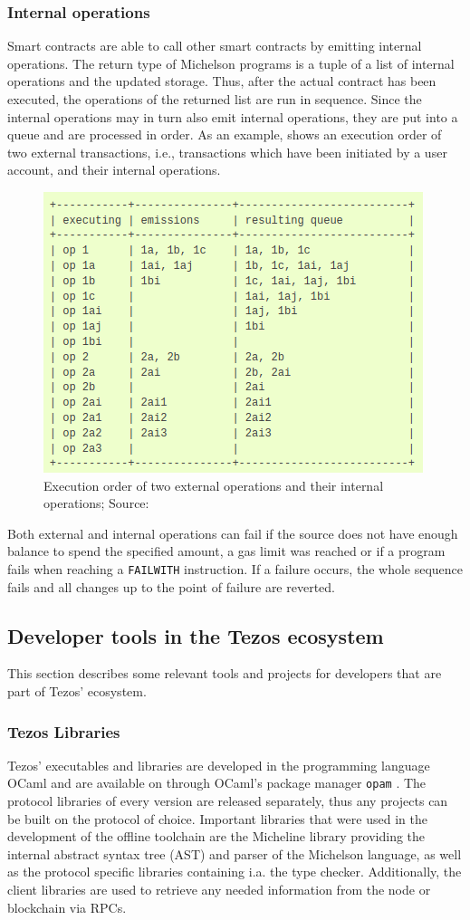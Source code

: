 \subsubsection{Internal operations}
Smart contracts are able to call other smart contracts by emitting internal operations. The return type of Michelson programs is a tuple of a list of internal operations and the updated storage. Thus, after the actual contract has been executed, the operations of the returned list are run in sequence. Since the internal operations may in turn also emit internal operations, they are put into a queue and are processed in order. As an example,  shows an execution order of two external transactions, i.e., transactions which have been initiated by a user account, and their internal operations.
\begin{figure}[h]
\centering
\includegraphics[width=0.5\linewidth]{figures/4-offline_tezos/internal_ops}
\caption{Execution order of two external operations and their internal operations; Source: \cite{tezos_docs}}
\label{fig:internal_ops}
\end{figure}

Both external and internal operations can fail if the source does not have enough balance to spend the specified amount, a gas limit was reached or if a program fails when reaching a \texttt{FAILWITH} instruction. If a failure occurs, the whole sequence fails and all changes up to the point of failure are reverted.

\subsection{Developer tools in the Tezos ecosystem}
This section describes some relevant tools and projects for developers that are part of Tezos' ecosystem.

\subsubsection{Tezos Libraries}
Tezos' executables and libraries are developed in the programming language OCaml and are available on through OCaml's package manager \texttt{opam} \cite{tezos_opam}. The protocol libraries of every version are released separately, thus any projects can be built on the protocol of choice. Important libraries that were used in the development of the offline toolchain are the Micheline library providing the internal abstract syntax tree (AST) and parser of the Michelson language, as well as the protocol specific libraries containing i.a. the type checker. Additionally, the client libraries are used to retrieve any needed information from the node or blockchain via RPCs.

